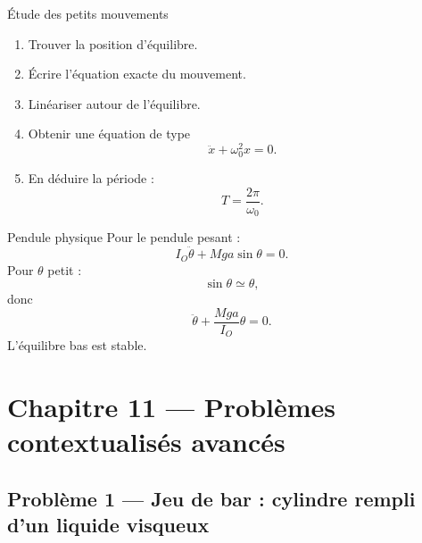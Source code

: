\documentclass[11pt,a4paper]{article}
\begin{document}
\begin{methodbox}{Étude des petits mouvements}{}
\begin{enumerate}
  \item Trouver la position d'équilibre.
  \item Écrire l'équation exacte du mouvement.
  \item Linéariser autour de l'équilibre.
  \item Obtenir une équation de type
  \[
  \ddot x+\omega_0^2x=0.
  \]
  \item En déduire la période :
  \[
  T=\frac{2\pi}{\omega_0}.
  \]
\end{enumerate}
\end{methodbox}

\begin{examplebox}{Pendule physique}{}
Pour le pendule pesant :
\[
I_O\ddot\theta+Mga\sin\theta=0.
\]
Pour $\theta$ petit :
\[
\sin\theta\simeq \theta,
\]
donc
\[
\ddot\theta+\frac{Mga}{I_O}\theta=0.
\]
L'équilibre bas est stable.
\end{examplebox}

\section{Chapitre 11 — Problèmes contextualisés avancés}

\subsection{Problème 1 — Jeu de bar : cylindre rempli d'un liquide visqueux}
\end{document}
